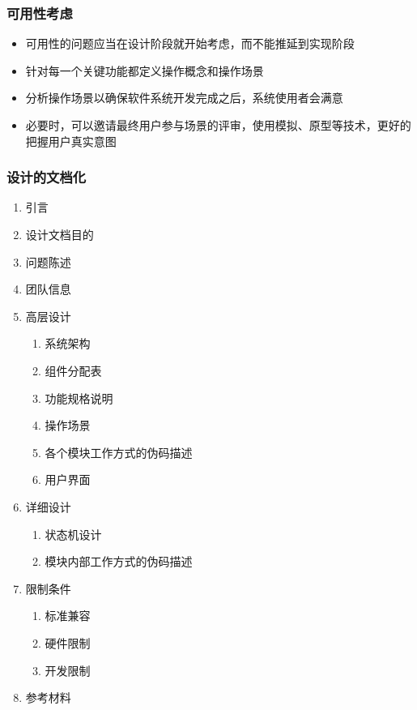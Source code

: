 \subsubsection{可用性考虑}
\begin{itemize}
    \item 可用性的问题应当在设计阶段就开始考虑，而不能推延到实现阶段
    \item 针对每一个关键功能都定义操作概念和操作场景
    \item 分析操作场景以确保软件系统开发完成之后，系统使用者会满意
    \item 必要时，可以邀请最终用户参与场景的评审，使用模拟、原型等技术，更好的把握用户真实意图
\end{itemize}

\subsubsection{设计的文档化}
\vspace{-0.8em}
\begin{multicols}{3}
    \begin{enumerate}[label=\arabic*.]
        \item 引言
        \item 设计文档目的
        \item 问题陈述
        \item 团队信息
        \item 高层设计
        \begin{enumerate}[label=\alph*.]
            \item 系统架构
            \item 组件分配表
            \item 功能规格说明
            \item 操作场景
            \item 各个模块工作方式的伪码描述
            \item 用户界面
        \end{enumerate}
        \item 详细设计
        \begin{enumerate}[label=\alph*.]
            \item 状态机设计
            \item 模块内部工作方式的伪码描述   
        \end{enumerate}
        \item 限制条件
        \begin{enumerate}[label=\alph*.]
            \item 标准兼容
            \item 硬件限制
            \item 开发限制   
        \end{enumerate}
        \item 参考材料
    \end{enumerate}
\end{multicols}
\vspace{-1em}

